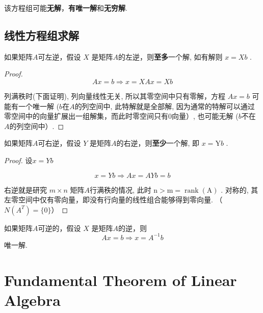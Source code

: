 该方程组可能\textbf{无解}，\textbf{有唯一解}和\textbf{无穷解}.

\subsection{线性方程组求解}

\begin{theorem}
    如果矩阵$A$可左逆，假设 $ X $ 是矩阵$A$的左逆，则\textbf{至多}一个解, 如有解则 $ x=X b $ . 
\end{theorem}

\begin{proof}
    $$
A x=b \Rightarrow  x=X A x=X b
$$

    列满秩时(下面证明), 列向量线性无关, 所以其零空间中只有零解，方程 $ {Ax}={b} $ 可能有一个唯一解 ($b$在$A$的列空间中, 此特解就是全部解, 因为通常的特解可以通过零空间中的向量扩展出一组解集，而此时零空间只有$0$向量）, 也可能无解 ($b$不在$A$的列空间中）. 
\end{proof}

\begin{theorem}
    如果矩阵$A$可右逆，假设 $ Y $ 是矩阵$A$的右逆，则\textbf{至少}一个解, 即 $ x=\mathrm{Y} b $ . 
\end{theorem}

\begin{proof}
    设$x=Y b$ 

    $$
x=Y b  \Rightarrow  A x=A Y b=b
$$


右逆就是研究 $m \times n $ 矩阵$A$行满秩的情况, 此时 $ \mathrm{n}>\mathrm{m}=\operatorname{rank}(\mathrm{A}) $ . 对称的, 其左零空间中仅有零向量，即没有行向量的线性组合能够得到零向量. （$N(A ^T ) = \{0\}$）
\end{proof}

\begin{theorem}
    如果矩阵$A$可逆的，假设 $ X $ 是矩阵$A$的逆，则
$$
A x=b  \Rightarrow  x=A^{-1} b
$$
唯一解. 
\end{theorem}

\section{Fundamental Theorem of Linear Algebra}

